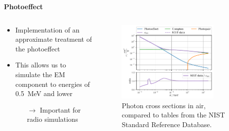 \documentclass[aspectratio=1610, 9pt]{beamer}
\begin{document}
\begin{frame}

\textbf{Photoeffect}

    \begin{columns}[onlytextwidth]
        \begin{column}{0.45\textwidth}
            \begin{itemize}
              \item Implementation of an approximate treatment of the photoeffect
              \item This allows us to simulate the EM component to energies of \SI{0.5}{\mega\electronvolt} and lower
              \begin{itemize}
                \item[$\rightarrow$] Important for radio simulations
              \end{itemize}
            \end{itemize}
        \end{column}
        \begin{column}{0.55\textwidth}
            \begin{figure}
                \centering
                \includegraphics[width=0.85\textwidth]{plots/photoeffect_nist.pdf}
                \caption{Photon cross sections in air, compared to tables from the NIST Standard Reference Database.}
            \end{figure}
        \end{column}
    \end{columns}
\end{frame}
\end{document}
